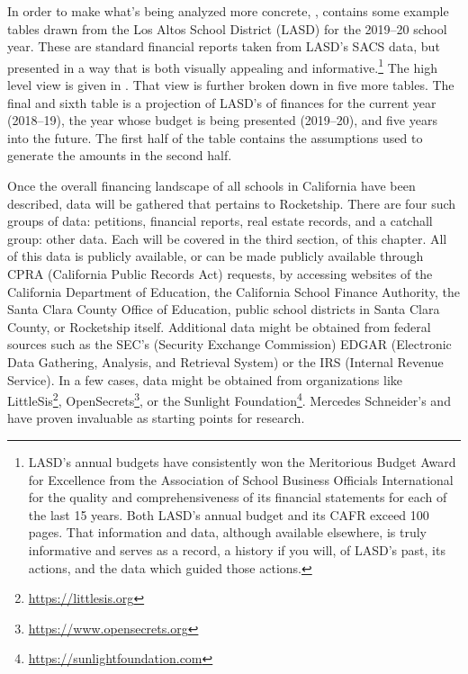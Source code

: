 In order to make what's being analyzed more concrete, , contains some example tables drawn from the Los Altos School District (LASD) for the 2019–20 school year. These are standard financial reports taken from LASD's SACS data, but presented in a way that is both visually appealing and informative.\footnote{LASD's annual budgets have consistently won the Meritorious Budget Award for Excellence from the Association of School Business Officials International for the quality and comprehensiveness of its financial statements for each of the last 15 years. Both LASD's annual budget and its CAFR exceed 100 pages. That information and data, although available elsewhere, is truly informative and serves as a record, a history if you will, of LASD's past, its actions, and the data which guided those actions.} The high level view is given in . That view is further broken down in five more tables. The final and sixth table is a projection of LASD's of finances for the current year (2018–19), the year whose budget is being presented (2019–20), and five years into the future. The first half of the table contains the assumptions used to generate the amounts in the second half.

Once the overall financing landscape of all schools in California have been described, data will be gathered that pertains to  Rocketship. There are four such groups of data: petitions, financial reports, real estate records, and a catchall group: other data. Each will be covered in the third section, \textit{} of this chapter. All of this data is publicly available, or can be made publicly available through CPRA (California Public Records Act) requests, by accessing websites of the California Department of Education, the California School Finance Authority, the Santa Clara County Office of Education, public school districts in Santa Clara County, or Rocketship itself. Additional data might be obtained from federal sources such as the SEC's (Security Exchange Commission) EDGAR (Electronic Data Gathering, Analysis, and Retrieval System) or the IRS (Internal Revenue Service). In a few cases, data might be obtained from organizations like LittleSis\footnote{\url{https://littlesis.org}}, OpenSecrets\footnote{\url{https://www.opensecrets.org}}, or the Sunlight Foundation\footnote{\url{https://sunlightfoundation.com}}. Mercedes Schneider's  \parencite{Schneider2020} and  \parencite{Schneider2014} have proven invaluable as starting points for research.

